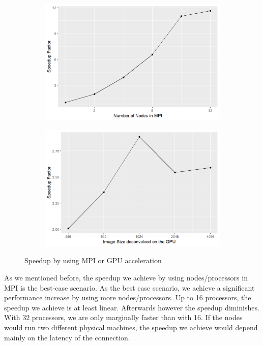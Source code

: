 \begin{figure}[h]
	\centering
		\begin{subfigure}[b]{0.45\linewidth}
		\includegraphics[width=1.00\linewidth]{./chapters/10.results/speedup/dist-speedup.png}
	\end{subfigure}
	\begin{subfigure}[b]{0.45\linewidth}
		\includegraphics[width=1.00\linewidth]{./chapters/10.results/speedup/gpu.png}
	\end{subfigure}
	\caption{Speedup by using MPI or GPU acceleration}
	\label{results:speedup:figure}
\end{figure}

As we mentioned before, the speedup we achieve by using nodes/processors in MPI is the best-case scenario. As the best case scenario, we achieve a significant performance increase by using more nodes/processors. Up to 16 processors, the speedup we achieve is at least linear. Afterwards however the speedup diminishes. With 32 processors, we are only marginally faster than with 16. If the nodes would run two different physical machines, the speedup we achieve would depend mainly on the latency of the connection. 

